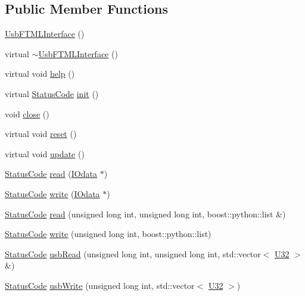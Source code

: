 \subsection*{Public Member Functions}
\begin{DoxyCompactItemize}
\item 
\hyperlink{classUsbFTMLInterface_aeb03292247ac4f7af188836b5c961f5d}{Usb\+F\+T\+M\+L\+Interface} ()
\item 
virtual \hyperlink{classUsbFTMLInterface_a0bf44726e717235861347e61ac76a799}{$\sim$\+Usb\+F\+T\+M\+L\+Interface} ()
\item 
virtual void \hyperlink{classUsbFTMLInterface_a1cfe65c58531afc07c21d876e21d8e46}{help} ()
\item 
virtual \hyperlink{classStatusCode}{Status\+Code} \hyperlink{classUsbFTMLInterface_a7f7c96ece97e607b88425823a2923a43}{init} ()
\item 
void \hyperlink{classUsbFTMLInterface_a1eaa27bd62bc381f60aa837f70a70117}{close} ()
\item 
virtual void \hyperlink{classUsbFTMLInterface_a1e53e5a0453e9aa731d1ec07aacbc8ab}{reset} ()
\item 
virtual void \hyperlink{classUsbFTMLInterface_a941ba5a5c0f398e5d26c97bb4111510d}{update} ()
\item 
\hyperlink{classStatusCode}{Status\+Code} \hyperlink{classUsbFTMLInterface_a9999929c6169c8b4ebe57b687b2dac28}{read} (\hyperlink{classIOdata}{I\+Odata} $\ast$)
\item 
\hyperlink{classStatusCode}{Status\+Code} \hyperlink{classUsbFTMLInterface_aa801e8875661d73b2afe25cb1fb94a94}{write} (\hyperlink{classIOdata}{I\+Odata} $\ast$)
\item 
\hyperlink{classStatusCode}{Status\+Code} \hyperlink{classUsbFTMLInterface_ae36cbbc258c8fc13b6c63f61bed4a8dc}{read} (unsigned long int, unsigned long int, boost\+::python\+::list \&)
\item 
\hyperlink{classStatusCode}{Status\+Code} \hyperlink{classUsbFTMLInterface_a151203f73f3e052a20ffc5809f2d6318}{write} (unsigned long int, boost\+::python\+::list)
\item 
\hyperlink{classStatusCode}{Status\+Code} \hyperlink{classUsbFTMLInterface_adbedf78154f460303edc20420c22c333}{usb\+Read} (unsigned long int, unsigned long int, std\+::vector$<$ \hyperlink{classUsbFTMLInterface_a142f8ce4b5873c295af8945f3894ae38}{U32} $>$ \&)
\item 
\hyperlink{classStatusCode}{Status\+Code} \hyperlink{classUsbFTMLInterface_a24eed1c8e7ba38e8a997aeff8b0e0a51}{usb\+Write} (unsigned long int, std\+::vector$<$ \hyperlink{classUsbFTMLInterface_a142f8ce4b5873c295af8945f3894ae38}{U32} $>$)

\end{DoxyCompactItemize}
